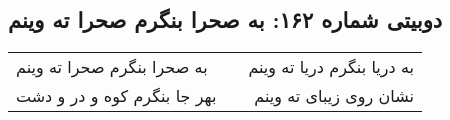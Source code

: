 \begin{center}
\section*{دوبیتی شماره ۱۶۲: به صحرا بنگرم صحرا ته وینم}
\label{sec:162}
\begin{longtable}{l p{0.5cm} r}
به صحرا بنگرم صحرا ته وینم
&&
به دریا بنگرم دریا ته وینم
\\
بهر جا بنگرم کوه و در و دشت
&&
نشان روی زیبای ته وینم
\\
\end{longtable}
\end{center}
